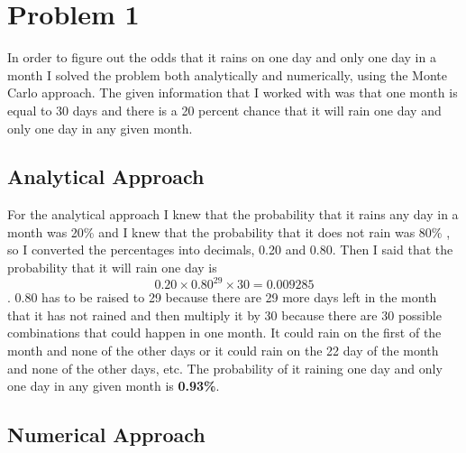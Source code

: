 \documentclass[twocolumn]{revtex4}
\begin{document}
\section{\bf Problem 1}

In order to figure out the odds that it rains on one day and only one day in a month I solved the problem both analytically and numerically, using the Monte Carlo approach. The given information that I worked with was that one month is equal to 30 days and there is a 20 percent chance that it will rain one day and only one day in any given month.

\subsection{\bf Analytical Approach}

For the analytical approach I knew that the probability that it rains any day in a month was 20\% and I knew that the probability that it does not rain was 80\% , so I converted the percentages into decimals, 0.20 and 0.80. Then I said that the probability that it will rain one day is $$ 0.20 \times 0.80^{29} \times 30 = 0.009285$$. 0.80 has to be raised to 29  because there are 29 more days left in the month that it has not rained and then multiply it by 30 because there are 30 possible combinations that could happen in one month. It could rain on the first of the month and none of the other days or it could rain on the 22 day of the month and none of the other days, etc. The probability of it raining one day and only one day in any given month is {\bf 0.93\%}.

\subsection{\bf Numerical Approach}
\end{document}
